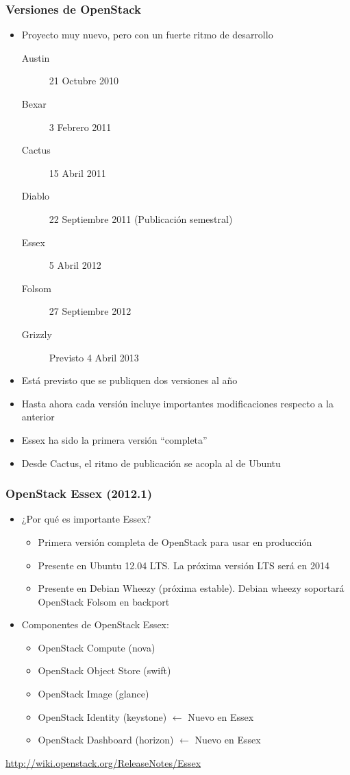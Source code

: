 \documentclass{beamer}
\begin{document}
\begin{frame}
  \frametitle{Versiones de OpenStack}
  \begin{itemize}
  \item Proyecto muy nuevo, pero con un fuerte ritmo de desarrollo
    \begin{description}
    \item[Austin] 21 Octubre 2010
    \item[Bexar] 3 Febrero 2011
    \item[Cactus] 15 Abril 2011
    \item[Diablo] 22 Septiembre 2011 (Publicación semestral)
    \item[Essex] 5 Abril 2012
    \item[Folsom] 27 Septiembre 2012
    \item[Grizzly] Previsto 4 Abril 2013
    \end{description}
  \item Está previsto que se publiquen dos versiones al año
  \item Hasta ahora cada versión incluye importantes modificaciones respecto a
    la anterior
  \item Essex ha sido la primera versión ``completa''
  \item Desde Cactus, el ritmo de publicación se acopla al de Ubuntu
  \end{itemize}
\end{frame}

\begin{frame}[fragile]
  \frametitle{OpenStack Essex (2012.1)}
  \begin{itemize}
  \item ¿Por qué es importante Essex?
    \begin{itemize}
    \item Primera versión completa de OpenStack para usar en producción
    \item Presente en Ubuntu 12.04 LTS. La próxima versión LTS será en 2014
    \item Presente en Debian Wheezy (próxima estable). Debian wheezy soportará
      OpenStack Folsom en backport
    \end{itemize}
  \item Componentes de OpenStack Essex:
    \begin{itemize}
    \item OpenStack Compute (nova)
    \item OpenStack Object Store (swift)
    \item OpenStack Image (glance)
    \item OpenStack Identity (keystone) $\leftarrow$ Nuevo en Essex
    \item OpenStack Dashboard (horizon) $\leftarrow$ Nuevo en Essex
    \end{itemize}
  \end{itemize}
  \url{http://wiki.openstack.org/ReleaseNotes/Essex}
\end{frame}
\end{document}
